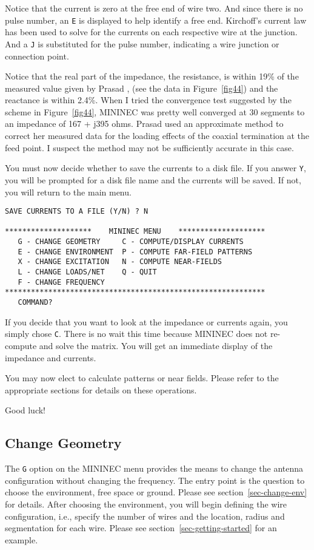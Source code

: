 \documentclass[12pt]{article}
\begin{document}
Notice that the current is zero at the free end of wire two. And since
there is no pulse number, an \verb+E+ is displayed to help identify a
free end. Kirchoff's current law has been used to solve for the currents
on each respective wire at the junction. And a \verb+J+ is substituted
for the pulse number, indicating a wire junction or connection point.

Notice that the real part of the impedance, the resistance, is within
19\% of the measured value given by Prasad \cite{r18}, (see
the data in Figure~\ref{fig44}) and the reactance is within 2.4\%. When
I tried the convergence test suggested by the scheme in Figure~\ref{fig44},
MININEC was pretty well converged at 30 segments to an impedance of
167 + j395 ohms. Prasad used an approximate method to correct her
measured data for the loading effects of the coaxial termination at the
feed point. I suspect the method may not be sufficiently accurate in
this case.

You must now decide whether to save the currents to a disk file. If you
answer \verb+Y+, you will be prompted for a disk file name and the
currents will be saved. If not, you will return to the main menu.

\clearpage
\begin{Verbatim}
SAVE CURRENTS TO A FILE (Y/N) ? N

********************    MININEC MENU    ********************
   G - CHANGE GEOMETRY     C - COMPUTE/DISPLAY CURRENTS
   E - CHANGE ENVIRONMENT  P - COMPUTE FAR-FIELD PATTERNS
   X - CHANGE EXCITATION   N - COMPUTE NEAR-FIELDS
   L - CHANGE LOADS/NET    Q - QUIT
   F - CHANGE FREQUENCY
************************************************************
   COMMAND?
\end{Verbatim}

If you decide that you want to look at the impedance or currents again,
you simply chose \verb+C+. There is no wait this time because MININEC
does not re-compute and solve the matrix. You will get an immediate
display of the impedance and currents.

You may now elect to calculate patterns or near fields. Please refer to
the appropriate sections for details on these operations.

Good luck!

\subsection{Change Geometry}
The \verb+G+ option on the MININEC menu provides the means to change the
antenna configuration without changing the frequency. The entry point is
the question to choose the environment, free space or ground. Please see
section~\ref{sec-change-env} for details. After choosing the environment, you
will begin defining the wire configuration, i.e., specify the number of
wires and the location, radius and segmentation for each wire. Please
see section~\ref{sec-getting-started} for an example.
\end{document}
